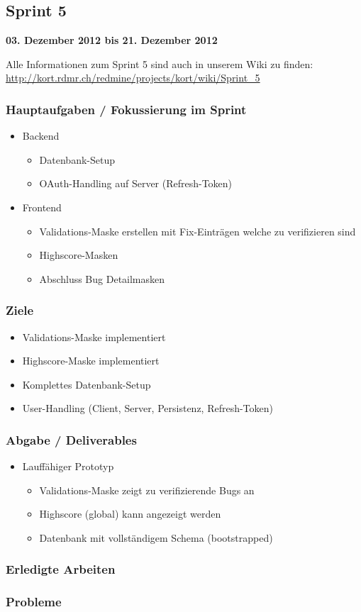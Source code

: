 \subsection{Sprint 5}

\textbf{03. Dezember 2012 bis 21. Dezember 2012}

Alle Informationen zum Sprint 5 sind auch in unserem Wiki zu finden:
\url{http://kort.rdmr.ch/redmine/projects/kort/wiki/Sprint_5}

\subsubsection{Hauptaufgaben / Fokussierung im Sprint}

\begin{itemize}
	\item Backend
	\begin{itemize}
		\item Datenbank-Setup
		\item OAuth-Handling auf Server (Refresh-Token)
	\end{itemize}
	\item Frontend
	\begin{itemize}
		\item Validations-Maske erstellen mit Fix-Einträgen welche zu verifizieren sind
		\item Highscore-Masken
		\item Abschluss Bug Detailmasken
	\end{itemize}
\end{itemize}

\subsubsection{Ziele}
\begin{itemize}
	\item Validations-Maske implementiert
	\item Highscore-Maske implementiert
	\item Komplettes Datenbank-Setup
	\item User-Handling (Client, Server, Persistenz, Refresh-Token)
\end{itemize}

\subsubsection{Abgabe / Deliverables}

\begin{itemize}
	\item Lauffähiger Prototyp
	\begin{itemize}
		\item Validations-Maske zeigt zu verifizierende Bugs an
		\item Highscore (global) kann angezeigt werden
		\item Datenbank mit vollständigem Schema (bootstrapped)
	\end{itemize}
\end{itemize}

\subsubsection{Erledigte Arbeiten}


\subsubsection{Probleme}
